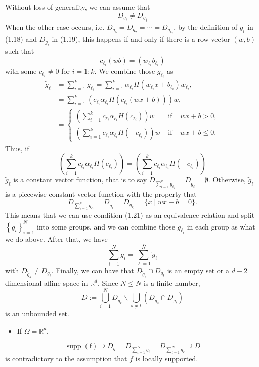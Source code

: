 \documentclass[10pt]{article}
\begin{document}
Without loss of generality, we can assume that
$$
D_{g_{i}} \neq D_{g_{j}}
$$
When the other case occurs, i.e. $D_{g_{6}}=D_{g_{2}}=\cdots=D_{g_{\ell_{2}}}$, by the definition of $g_{i}$ in (1.18) and $D_{g_{i}}$ in (1.19), this happens if and only if there is a row vector $(w, b)$ such that
$$
c_{\ell_{i}}(w b)=\left(w_{\ell_{i}} b_{\ell_{i}}\right)
$$
with some $c_{\ell_{i}} \neq 0$ for $i=1: k$. We combine those $g_{\ell_{i}}$ as
$$
\begin{aligned}
\tilde{g}_{\ell} &=\sum_{i=1}^{k} g_{\ell_{i}}=\sum_{i=1}^{k} \alpha_{\ell_{i}} H\left(w_{\ell_{i}} x+b_{\ell_{i}}\right) w_{\ell_{i}}, \\
&=\sum_{i=1}^{k}\left(c_{\ell_{i}} \alpha_{\ell_{i}} H\left(c_{\ell_{i}}(w x+b)\right)\right) w, \\
&=\left\{\begin{array}{lll}
\left(\sum_{i=1}^{k} c_{\ell_{i}} \alpha_{\ell_{i}} H\left(c_{\ell_{i}}\right)\right) w & \text { if } & w x+b>0, \\
\left(\sum_{i=1}^{k} c_{\ell_{i}} \alpha_{\ell_{i}} H\left(-c_{\ell_{i}}\right)\right) w & \text { if } & w x+b \leq 0 .
\end{array}\right.
\end{aligned}
$$
Thus, if
$$
\left(\sum_{i=1}^{k} c_{\ell_{i}} \alpha_{\ell_{i}} H\left(c_{\ell_{i}}\right)\right)=\left(\sum_{i=1}^{k} c_{\ell_{i}} \alpha_{\ell_{i}} H\left(-c_{\ell_{i}}\right)\right)
$$
$\tilde{g}_{\ell}$ is a constant vector function, that is to say $D_{\sum_{i=1}^{k} g_{\ell_{i}}}=D_{\tilde{g}_{\ell}}=\emptyset .$ Otherwise, $\tilde{g}_{\ell}$ is a piecewise constant vector function with the property that
$$
D_{\sum_{i=1}^{k} g_{\ell_{i}}}=D_{\tilde{g}_{\ell}}=D_{g_{\ell_{i}}}=\{x \mid w x+b=0\} .
$$
This means that we can use condition (1.21) as an equivalence relation and split $\left\{g_{i}\right\}_{i=1}^{N}$ into some groups, and we can combine those $g_{\ell_{i}}$ in each group as what we do above. After that, we have
$$
\sum_{i=1}^{N} g_{i}=\sum_{\ell=1}^{\bar{N}} \tilde{g}_{\ell}
$$
with $D_{\tilde{g}_{s}} \neq D_{\bar{g}_{t}}$. Finally, we can have that $D_{\tilde{g}_{s}} \cap D_{\bar{g}_{t}}$ is an empty set or a $d-2$ dimensional affine space in $\mathbb{R}^{d} .$ Since $N \leq N$ is a finite number,
$$
D:=\bigcup_{i=1}^{N} D_{\tilde{g}_{\ell}} \backslash \bigcup_{s \neq t}\left(D_{\tilde{g}_{s}} \cap D_{\tilde{g}_{t}}\right)
$$
is an unbounded set.

  \begin{itemize}
    \item If $\Omega=\mathbb{R}^{d}$,
  \end{itemize}
$$
\operatorname{supp}(\mathrm{f}) \supseteq D_{g}=D_{\sum_{i=1}^{N} g_{i}}=D_{\sum_{t=1}^{N} \tilde{g}_{\ell}} \supseteq D
$$
is contradictory to the assumption that $f$ is locally supported.
\end{document}
